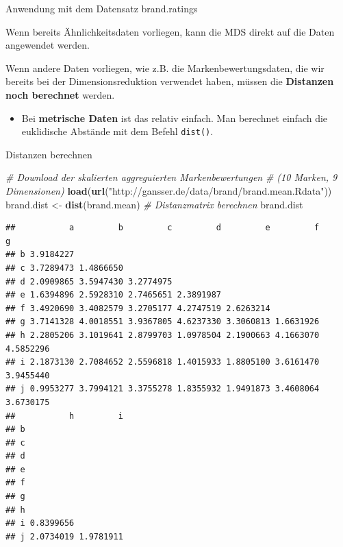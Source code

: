 \documentclass[12pt,ngerman,a4paper,ignorenonframetext,]{beamer}
\newenvironment{Shaded}{\begin{snugshade}}{\end{snugshade}}
\newcommand{\CommentTok}[1]{\textcolor[rgb]{0.56,0.35,0.01}{\textit{#1}}}
\newcommand{\KeywordTok}[1]{\textcolor[rgb]{0.13,0.29,0.53}{\textbf{#1}}}
\newcommand{\NormalTok}[1]{#1}
\newcommand{\StringTok}[1]{\textcolor[rgb]{0.31,0.60,0.02}{#1}}
\providecommand{\tightlist}{%
  \setlength{\itemsep}{0pt}\setlength{\parskip}{0pt}}
\begin{document}
\begin{frame}[fragile]{Anwendung mit dem Datensatz brand.ratings}
\protect\hypertarget{anwendung-mit-dem-datensatz-brand.ratings}{}

Wenn bereits Ähnlichkeitsdaten vorliegen, kann die MDS direkt auf die
Daten angewendet werden.

Wenn andere Daten vorliegen, wie \mbox{z.\thinspace{}B.}\xspace{} die
Markenbewertungsdaten, die wir bereits bei der Dimensionsreduktion
verwendet haben, müssen die \textbf{Distanzen noch berechnet} werden.

\begin{itemize}
\tightlist
\item
  Bei \textbf{metrische Daten} ist das relativ einfach. Man berechnet
  einfach die euklidische Abstände mit dem Befehl \texttt{dist()}.
\end{itemize}

\end{frame}

\begin{frame}{Distanzen berechnen}
\protect\hypertarget{distanzen-berechnen}{}

\begin{Shaded}
\begin{Highlighting}[]
\CommentTok{# Download der skalierten aggreguierten Markenbewertungen }
\CommentTok{# (10 Marken, 9 Dimensionen)}
\KeywordTok{load}\NormalTok{(}\KeywordTok{url}\NormalTok{(}\StringTok{"http://gansser.de/data/brand/brand.mean.Rdata"}\NormalTok{)) }
\NormalTok{brand.dist <-}\StringTok{ }\KeywordTok{dist}\NormalTok{(brand.mean) }\CommentTok{# Distanzmatrix berechnen}
\NormalTok{brand.dist}
\end{Highlighting}
\end{Shaded}

\begin{verbatim}
##           a         b         c         d         e         f         g
## b 3.9184227                                                            
## c 3.7289473 1.4866650                                                  
## d 2.0909865 3.5947430 3.2774975                                        
## e 1.6394896 2.5928310 2.7465651 2.3891987                              
## f 3.4920690 3.4082579 3.2705177 4.2747519 2.6263214                    
## g 3.7141328 4.0018551 3.9367805 4.6237330 3.3060813 1.6631926          
## h 2.2805206 3.1019641 2.8799703 1.0978504 2.1900663 4.1663070 4.5852296
## i 2.1873130 2.7084652 2.5596818 1.4015933 1.8805100 3.6161470 3.9455440
## j 0.9953277 3.7994121 3.3755278 1.8355932 1.9491873 3.4608064 3.6730175
##           h         i
## b                    
## c                    
## d                    
## e                    
## f                    
## g                    
## h                    
## i 0.8399656          
## j 2.0734019 1.9781911
\end{verbatim}

\end{frame}
\end{document}
